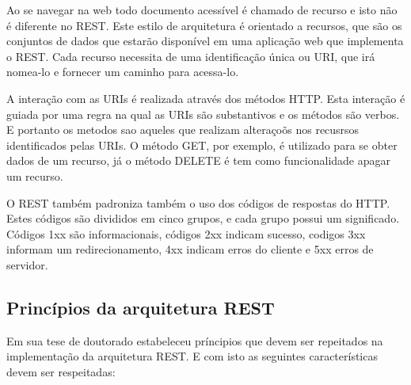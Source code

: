 \documentclass[
	12pt,				%
	openright,			%
	oneside,			%
	a4paper,			%
	english,			%
	french,				%
	spanish,			%
	brazil				%
	]{abntex2}
\begin{document}
Ao se navegar na web todo documento acessível é chamado de recurso e isto não é diferente no REST. Este estilo de arquitetura é orientado a recursos, que são os conjuntos de dados que estarão disponível em uma aplicação web que implementa o REST. Cada recurso necessita de uma identificação única ou URI, que irá nomea-lo e fornecer um caminho para acessa-lo.

A interação com as URIs é realizada através dos métodos HTTP. Esta interação é guiada por uma regra na qual as URIs são substantivos e os métodos são verbos. E portanto os metodos sao aqueles que realizam alteraçoõs nos recusrsos identificados pelas URIs. O método GET, por exemplo, é utilizado para se obter dados de um recurso, já o método DELETE é tem como funcionalidade apagar um recurso. 

O REST também padroniza também o uso dos códigos de respostas do HTTP. Estes códigos são divididos em cinco grupos, e cada grupo possui um significado. Códigos 1xx são informacionais, códigos 2xx indicam sucesso, codigos 3xx informam um redirecionamento, 4xx indicam erros do cliente e 5xx erros de servidor.

\subsection{Princípios da arquitetura REST}

Em sua tese de doutorado  estabeleceu príncipios que devem ser repeitados na implementação da arquitetura REST. E com isto as seguintes características devem ser respeitadas:
\end{document}
